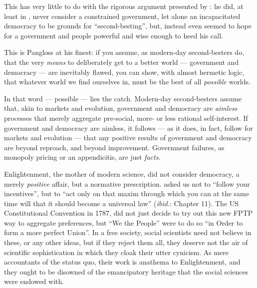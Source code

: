 \documentclass[11pt,a4paper,oneside,openright]{article}
\begin{document}
This has very little to do with the rigorous argument presented by \citeauthor{Lancaster1956}: 
he did, at least in \citeyear{Lancaster1956}, never consider a constrained government, let alone an incapacitated democracy to be grounds for ``second-besting'', but, instead even seemed to hope for a government and people powerful and wise enough to heed his call. 

This is Pangloss at his finest: 
if you assume, as modern-day second-besters do, that the very \emph{means} to deliberately get to a better world --- government and democracy --- are inevitably flawed, you can show, with almost hermetic logic, that whatever world we find ourselves in, must be the best of all \emph{possible} worlds. 

In that word --- possible --- lies the catch. 
Modern-day second-besters assume that, akin to markets and evolution, government and democracy are \emph{aimless} processes that merely aggregate pre-social, more- or less rational self-interest. 
If government and democracy are aimless, it follows --- as it does, in fact, follow for markets and evolution --- that any positive results of government and democracy are beyond reproach, and beyond improvement. 
Government failures, as monopoly pricing or an appendicitis, are just \emph{facts}. 

Enlightenment, the mother of modern science, did not consider democracy, a merely \emph{positive} affair, but a normative prescription. 
\cite{Kant1785} asked us not to ``follow your incentives'', but to ``act only on that maxim through which you can at the same time will that it should become a universal law'' (\emph{ibid.}: Chapter 11). 
The US Constitutional Convention in 1787, did not just decide to try out this new \gls{FPTP} way to aggregate preferences, but ``We the People'' were to do so ``in Order to form a more perfect Union''.
In a free society, social scientists need not believe in these, or any other ideas, but if they reject them all, they deserve not the air of scientific sophistication in which they cloak their utter cynicism. 
As mere accountants of the status quo, their work is anathema to Enlightenment, and they ought to be disowned of the emancipatory heritage that the social sciences were endowed with.
\end{document}
